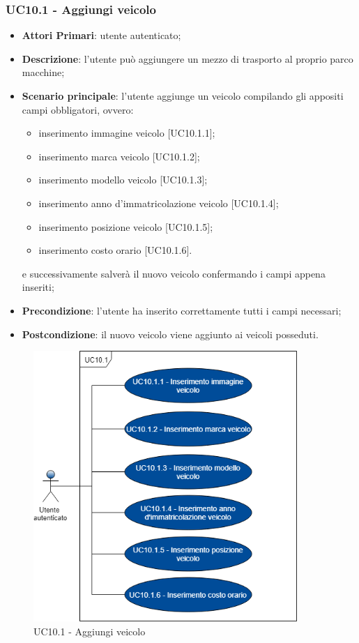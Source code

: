  \subsubsection{UC10.1 - Aggiungi veicolo}
 \begin{itemize}
 	\item \textbf{Attori Primari}: utente autenticato;
 	\item \textbf{Descrizione}: l'utente può aggiungere un mezzo di trasporto al proprio parco macchine;
 	\item \textbf{Scenario principale}: l'utente aggiunge un veicolo compilando gli appositi campi obbligatori, ovvero:
 	\begin{itemize}
 		\item inserimento immagine veicolo [UC10.1.1];
 		\item inserimento marca veicolo [UC10.1.2];
 		\item inserimento modello veicolo [UC10.1.3];
 		\item inserimento anno d'immatricolazione veicolo [UC10.1.4];
 		\item inserimento posizione veicolo [UC10.1.5];
 		\item inserimento costo orario [UC10.1.6].
 	\end{itemize}
 	e successivamente salverà il nuovo veicolo confermando i campi appena inseriti;
 	\item \textbf{Precondizione}: l'utente ha inserito correttamente tutti i campi necessari;
 	\item \textbf{Postcondizione}: il nuovo veicolo viene aggiunto ai veicoli posseduti.
 \end{itemize}
\begin{figure}[H]
	\includegraphics[width=10cm]{res/images/UC10-1Aggiungiveicolo.png}
	\centering
	\caption{UC10.1 - Aggiungi veicolo}
\end{figure}
